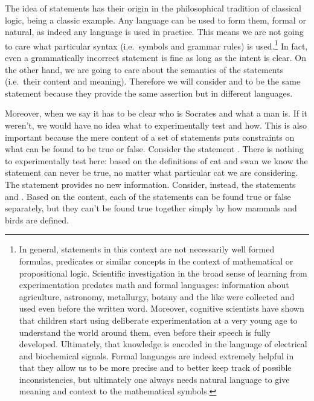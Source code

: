 The idea of statements has their origin in the philosophical tradition of classical logic,  being a classic example. Any language can be used to form them, formal or natural, as indeed any language is used in practice. This means we are not going to care what particular syntax (i.e.~symbols and grammar rules) is used.\footnote{In general, statements in this context are not necessarily well formed formulas, predicates or similar concepts in the context of mathematical or propositional logic. Scientific investigation in the broad sense of learning from experimentation predates math and formal languages: information about agriculture, astronomy, metallurgy, botany and the like were collected and used even before the written word. Moreover, cognitive scientists have shown that children start using deliberate experimentation at a very young age to understand the world around them, even before their speech is fully developed. Ultimately, that knowledge is encoded in the language of electrical and biochemical signals. Formal languages are indeed extremely helpful in that they allow us to be more precise and to better keep track of possible inconsistencies, but ultimately one always needs natural language to give meaning and context to the mathematical symbols.} In fact, even a grammatically incorrect statement is fine as long as the intent is clear. On the other hand, we are going to care about the semantics of the statements (i.e.~their content and meaning). Therefore we will consider  and  to be the same statement because they provide the same assertion but in different languages.

Moreover, when we say  it has to be clear who is Socrates and what a man is. If it weren't, we would have no idea what to experimentally test and how. This is also important because the mere content of a set of statements puts constraints on what can be found to be true or false. Consider the statement . There is nothing to experimentally test here: based on the definitions of cat and swan we know the statement can never be true, no matter what particular cat we are considering. The statement provides no new information. Consider, instead, the statements  and . Based on the content, each of the statements can be found true or false separately, but they can't be found true together simply by how mammals and birds are defined.

